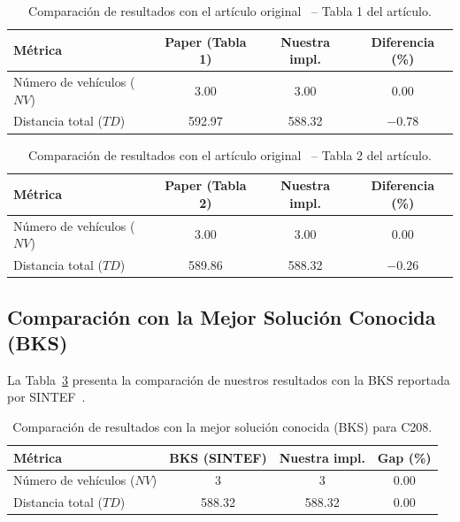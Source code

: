 \documentclass[12pt, letterpaper]{article}
\begin{document}
\begin{table}[H]
  \centering
  \caption{Comparación de resultados con el artículo original~\cite{gambardella1999} -- Tabla 1 del artículo.}
  \label{tab:comparacion_paper}
  \begin{tabular}{lccc}
    \toprule
    \textbf{Métrica} & \textbf{Paper (Tabla 1)} & \textbf{Nuestra impl.} & \textbf{Diferencia (\%)} \\
    \midrule
    Número de vehículos ($NV$) & 3.00  & 3.00 & 0.00 \\
    Distancia total ($TD$)     & 592.97 & 588.32 & $-0.78$ \\
    \bottomrule
  \end{tabular}
\end{table}

\begin{table}[H]
  \centering
  \caption{Comparación de resultados con el artículo original~\cite{gambardella1999} -- Tabla 2 del artículo.}
  \label{tab:comparacion_paper2}
  \begin{tabular}{lccc}
    \toprule
    \textbf{Métrica} & \textbf{Paper (Tabla 2)} & \textbf{Nuestra impl.} & \textbf{Diferencia (\%)} \\
    \midrule
    Número de vehículos ($NV$) & 3.00  & 3.00 & 0.00 \\
    Distancia total ($TD$)     & 589.86 & 588.32 & $-0.26$ \\
    \bottomrule
  \end{tabular}
\end{table}

\subsection{Comparación con la Mejor Solución Conocida (BKS)}
\label{subsec:comparacion_bks}

La Tabla~\ref{tab:comparacion_bks} presenta la comparación de nuestros resultados con la BKS reportada por SINTEF~\cite{sintef2024}.

\begin{table}[H]
  \centering
  \caption{Comparación de resultados con la mejor solución conocida (BKS) para C208.}
  \label{tab:comparacion_bks}
  \begin{tabular}{lccc}
    \toprule
    \textbf{Métrica} & \textbf{BKS (SINTEF)} & \textbf{Nuestra impl.} & \textbf{Gap (\%)} \\
    \midrule
    Número de vehículos ($NV$) & 3      & 3 & 0.00 \\
    Distancia total ($TD$)     & 588.32 & 588.32 & 0.00 \\
    \bottomrule
  \end{tabular}
\end{table}
\end{document}
